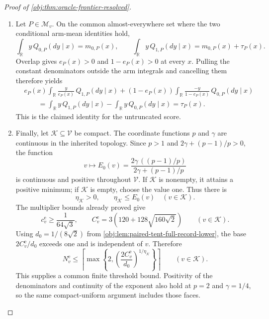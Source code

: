 \begin{proof}[Proof of \cref{obj:thm:oracle-frontier-resolved}]
\begin{enumerate}
\item Let \(P\in\mathcal M_v\). On the common almost-everywhere set where the two conditional arm-mean identities hold,
\[
\int_{\mathbb R}y\,Q_{0,P}(dy\mid x)=m_{0,P}(x),
\qquad
\int_{\mathbb R}y\,Q_{1,P}(dy\mid x)=m_{0,P}(x)+\tau_P(x).
\]
Overlap gives \(e_P(x)>0\) and \(1-e_P(x)>0\) at every \(x\). Pulling the constant denominators outside the arm integrals and cancelling them therefore yields
\[
\begin{aligned}
&e_P(x)\int_{\mathbb R}\frac{y}{e_P(x)}\,Q_{1,P}(dy\mid x)
+(1-e_P(x))
\int_{\mathbb R}\frac{-y}{1-e_P(x)}\,Q_{0,P}(dy\mid x)\\
&\qquad=
\int_{\mathbb R}y\,Q_{1,P}(dy\mid x)
-\int_{\mathbb R}y\,Q_{0,P}(dy\mid x)
=\tau_P(x).
\end{aligned}
\]
This is the claimed identity for the untruncated score.

\item Finally, let \(\mathcal K\subseteq\mathcal V\) be compact. The coordinate functions \(p\) and \(\gamma\) are continuous in the inherited topology. Since \(p>1\) and \(2\gamma+(p-1)/p>0\), the function
\[
v\longmapsto
E_0(v)=
\frac{2\gamma\,((p-1)/p)}
{2\gamma+(p-1)/p}
\]
is continuous and positive throughout \(\mathcal V\). If \(\mathcal K\) is nonempty, it attains a positive minimum; if \(\mathcal K\) is empty, choose the value one. Thus there is
\[
\eta_{\mathcal K}>0,
\qquad
\eta_{\mathcal K}\le E_0(v)\quad(v\in\mathcal K).
\]
The multiplier bounds already proved give
\[
c^{\mathrm e}_v\ge\frac1{64\sqrt3},
\qquad
C^{\mathrm e}_v=3\left(120+128\sqrt{160\sqrt2}\right)
\qquad(v\in\mathcal K).
\]
Using \(d_0=1/(8\sqrt2)\) from \cref{obj:lem:paired-tent-full-record-lower}, the base \(2C^{\mathrm e}_v/d_0\) exceeds one and is independent of \(v\). Therefore
\[
N^{\mathrm e}_v
\le
\left\lceil
\max\left\{
2,\left(\frac{2C^{\mathrm e}_v}{d_0}\right)^{1/\eta_{\mathcal K}}
\right\}
\right\rceil
\qquad(v\in\mathcal K).
\]
This supplies a common finite threshold bound. Positivity of the denominators and continuity of the exponent also hold at \(p=2\) and \(\gamma=1/4\), so the same compact-uniform argument includes those faces.
\end{enumerate}
\end{proof}

